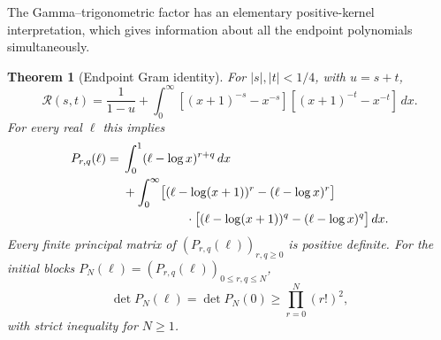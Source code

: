 \documentclass[11pt,a4paper]{article}
\numberwithin{equation}{section}
\newtheorem{theorem}{Theorem}[section]
\theoremstyle{definition}
\theoremstyle{remark}
\begin{document}
The Gamma--trigonometric factor has an elementary positive-kernel
interpretation, which gives information about all the endpoint
polynomials simultaneously.

\begin{theorem}[Endpoint Gram identity]\label{thm:endpoint-gram}
For $|s|,|t|<1/4$, with $u=s+t$,
\begin{equation}\label{eq:R-integral}
 \mathcal R(s,t)=\frac1{1-u}+
 \int_0^\infty
 [(x+1)^{-s}-x^{-s}][(x+1)^{-t}-x^{-t}]\,dx.
\end{equation}
For every real $\ell$ this implies
\begin{align}
 P_{r,q}(\ell)={}&\int_0^1(\ell-\log x)^{r+q}\,dx\notag\\
 &+\int_0^\infty
 \bigl[(\ell-\log(x+1))^r-(\ell-\log x)^r\bigr]\notag\\
 &\hspace{18mm}\cdot
 \bigl[(\ell-\log(x+1))^q-(\ell-\log x)^q\bigr]\,dx.
 \label{eq:P-gram}
\end{align}
Every finite principal matrix of $(P_{r,q}(\ell))_{r,q\geq0}$ is
positive definite. For the initial blocks
$P_N(\ell)=(P_{r,q}(\ell))_{0\leq r,q\leq N}$,
\begin{equation}\label{eq:P-determinant}
 \det P_N(\ell)=\det P_N(0)\geq\prod_{r=0}^N(r!)^2,
\end{equation}
with strict inequality for $N\geq1$.
\end{theorem}
\end{document}
